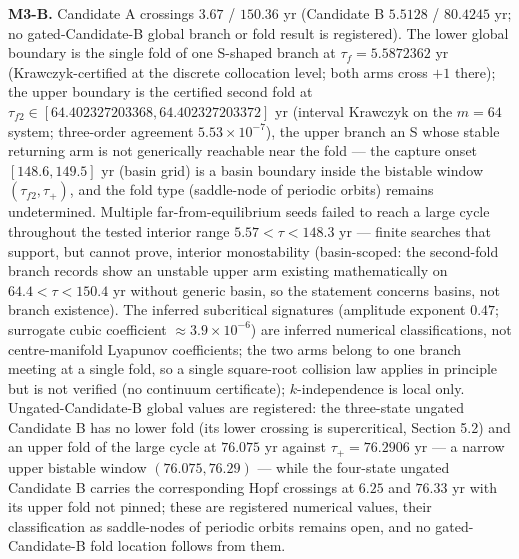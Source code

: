 \documentclass[11pt]{article}
\begin{document}
\textbf{M3-B.} Candidate A crossings \(3.67\) / \(150.36\) yr (Candidate
B \(5.5128\) / \(80.4245\) yr; no gated-Candidate-B global branch or
fold result is registered). The lower global boundary is the single fold
of one S-shaped branch at \(\tau_f = 5.5872362\) yr (Krawczyk-certified
at the discrete collocation level; both arms cross \(+1\) there); the
upper boundary is the certified second fold at
\(\tau_{f2} \in [64.402327203368, 64.402327203372]\) yr (interval
Krawczyk on the \(m = 64\) system; three-order agreement
\(5.53\times10^{-7}\)), the upper branch an S whose stable returning arm
is not generically reachable near the fold --- the capture onset
\([148.6, 149.5]\) yr (basin grid) is a basin boundary inside the
bistable window \((\tau_{f2}, \tau_+)\), and the fold type (saddle-node
of periodic orbits) remains undetermined. Multiple far-from-equilibrium
seeds failed to reach a large cycle throughout the tested interior range
\(5.57 < \tau < 148.3\) yr --- finite searches that support, but cannot
prove, interior monostability (basin-scoped: the second-fold branch
records show an unstable upper arm existing mathematically on
\(64.4 < \tau < 150.4\) yr without generic basin, so the statement
concerns basins, not branch existence). The inferred subcritical
signatures (amplitude exponent \(0.47\); surrogate cubic coefficient
\(\approx3.9\times10^{-6}\)) are inferred numerical classifications, not
centre-manifold Lyapunov coefficients; the two arms belong to one branch
meeting at a single fold, so a single square-root collision law applies
in principle but is not verified (no continuum certificate);
\(k\)-independence is local only. Ungated-Candidate-B global values are
registered: the three-state ungated Candidate B has no lower fold (its
lower crossing is supercritical, Section 5.2) and an upper fold of the
large cycle at \(76.075\) yr against \(\tau_+ = 76.2906\) yr --- a
narrow upper bistable window \((76.075, 76.29)\) --- while the
four-state ungated Candidate B carries the corresponding Hopf crossings
at \(6.25\) and \(76.33\) yr with its upper fold not pinned; these are
registered numerical values, their classification as saddle-nodes of
periodic orbits remains open, and no gated-Candidate-B fold location
follows from them.
\end{document}
